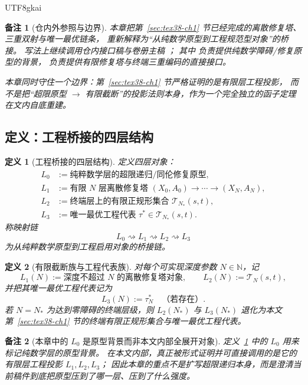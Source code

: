 \documentclass[12pt]{article}
\newtheorem{definition}{定义}[section]
\newtheorem{remark}{备注}[section]
\newcommand{\NN}{\mathbb{N}}
\begin{document}
\begin{CJK*}{UTF8}{gkai}
\begin{remark}[仓内外参照与边界]
本章把第~\ref{sec:tex38-ch1} 节已经完成的离散修复塔、三重双射与唯一最优链条，
重新解释为“从纯数学原型到工程规范型对象”的桥接。
写法上继续调用仓内接口稿与卷册主稿
\cite{RepoTex31RepairTower,RepoTex32ConditionalConvergence,RepoTex36HomotopyTwistBijection,RepoTex6JacobiGap,
  GaoZheng2025GFramework,GaoZhengAppVol3}；
其中 \cite{GaoZheng2025GFramework,GaoZhengAppVol3} 负责提供纯数学障碍/修复原型的背景，
\cite{RepoTex31RepairTower,RepoTex36HomotopyTwistBijection} 负责提供有限修复塔与终端三重编码的直接接口。

本章同时守住一个边界：第~\ref{sec:tex38-ch1} 节严格证明的是有限层工程投影，
而不是把“超限原型 $\to$ 有限截断”的投影法则本身，作为一个完全独立的函子定理在文内自底重建。
\end{remark}

\subsection{定义：工程桥接的四层结构}
\label{subsec:tex38-bridge-layers}

\begin{definition}[工程桥接的四层结构]
\label{def:tex38-bridge-layers}
定义四层对象：
\begin{align*}
  L_0&:=\text{纯粹数学层的超限递归/同伦修复原型},\\
  L_1&:=\text{有限 $N$ 层离散修复塔 }(X_0,A_0)\to\cdots\to(X_N,A_N),\\
  L_2&:=\text{终端层上的有限正规形集合 }\mathcal{T}_{N_\ast}(s,t),\\
  L_3&:=\text{唯一最优工程代表 }\tau^\ast\in \mathcal{T}_{N_\ast}(s,t).
\end{align*}
称映射链
\[
  L_0\rightsquigarrow L_1\rightsquigarrow L_2\rightsquigarrow L_3
\]
为\emph{从纯粹数学原型到工程启用对象的桥接链}。
\end{definition}

\begin{definition}[有限截断族与工程代表族]
\label{def:tex38-bridge-family}
对每个可实现深度参数 $N\in\NN$，记
\[
  L_1(N):=\text{深度不超过 $N$ 的离散修复塔对象},
  \qquad
  L_2(N):=\mathcal{T}_{N}(s,t),
\]
并把其唯一最优工程代表记为
\[
  L_3(N):=\tau_N^\ast
  \quad\text{（若存在）}.
\]
若 $N=N_\ast$ 为达到零障碍的终端层级，则 $L_2(N_\ast)$ 与 $L_3(N_\ast)$ 退化为本文第~\ref{sec:tex38-ch1} 节的终端有限正规形集合与唯一最优工程代表。
\end{definition}

\begin{remark}[本章中的 $L_0$ 是原型背景而非本文内部全展开对象]
定义~\ref{def:tex38-bridge-layers} 中的 $L_0$ 用来标记纯数学层的原型背景。
在本文内部，真正被形式证明并可直接调用的是它的有限层工程投影 $L_1,L_2,L_3$；
因此本章的重点不是扩写超限递归本身，而是澄清当前稿件到底把原型压到了哪一层、压到了什么强度。
\end{remark}


\end{CJK*}
\end{document}
